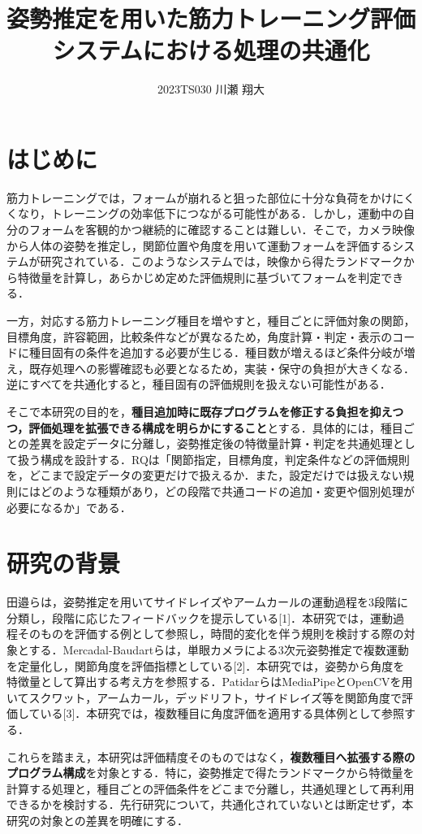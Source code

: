 \documentclass[no-page-number]{nanzan-abstract}
\title{姿勢推定を用いた筋力トレーニング評価システムにおける処理の共通化}
\author{2023TS030 川瀬 翔大}
\begin{document}
\maketitle

\section{はじめに}
筋力トレーニングでは，フォームが崩れると狙った部位に十分な負荷をかけにくくなり，トレーニングの効率低下につながる可能性がある．しかし，運動中の自分のフォームを客観的かつ継続的に確認することは難しい．そこで，カメラ映像から人体の姿勢を推定し，関節位置や角度を用いて運動フォームを評価するシステムが研究されている．このようなシステムでは，映像から得たランドマークから特徴量を計算し，あらかじめ定めた評価規則に基づいてフォームを判定できる．
\par
一方，対応する筋力トレーニング種目を増やすと，種目ごとに評価対象の関節，目標角度，許容範囲，比較条件などが異なるため，角度計算・判定・表示のコードに種目固有の条件を追加する必要が生じる．種目数が増えるほど条件分岐が増え，既存処理への影響確認も必要となるため，実装・保守の負担が大きくなる．逆にすべてを共通化すると，種目固有の評価規則を扱えない可能性がある．
\par
そこで本研究の目的を，\textbf{種目追加時に既存プログラムを修正する負担を抑えつつ，評価処理を拡張できる構成を明らかにすること}とする．具体的には，種目ごとの差異を設定データに分離し，姿勢推定後の特徴量計算・判定を共通処理として扱う構成を設計する．RQは「関節指定，目標角度，判定条件などの評価規則を，どこまで設定データの変更だけで扱えるか．また，設定だけでは扱えない規則にはどのような種類があり，どの段階で共通コードの追加・変更や個別処理が必要になるか」である．

\section{研究の背景}
田邉らは，姿勢推定を用いてサイドレイズやアームカールの運動過程を3段階に分類し，段階に応じたフィードバックを提示している[1]．本研究では，運動過程そのものを評価する例として参照し，時間的変化を伴う規則を検討する際の対象とする．Mercadal-Baudartらは，単眼カメラによる3次元姿勢推定で複数運動を定量化し，関節角度を評価指標としている[2]．本研究では，姿勢から角度を特徴量として算出する考え方を参照する．PatidarらはMediaPipeとOpenCVを用いてスクワット，アームカール，デッドリフト，サイドレイズ等を関節角度で評価している[3]．本研究では，複数種目に角度評価を適用する具体例として参照する．
\par
これらを踏まえ，本研究は評価精度そのものではなく，\textbf{複数種目へ拡張する際のプログラム構成}を対象とする．特に，姿勢推定で得たランドマークから特徴量を計算する処理と，種目ごとの評価条件をどこまで分離し，共通処理として再利用できるかを検討する．先行研究について，共通化されていないとは断定せず，本研究の対象との差異を明確にする．
\end{document}
